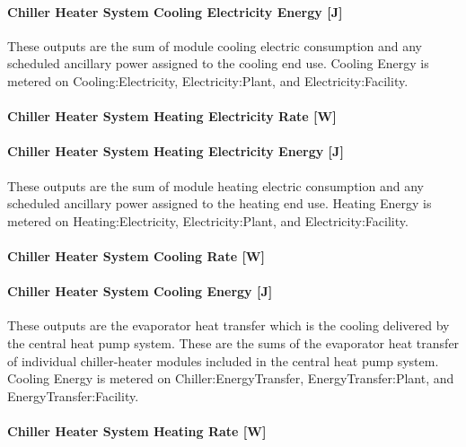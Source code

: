 \paragraph{Chiller Heater System Cooling Electricity Energy {[}J{]}}\label{chiller-heater-system-cooling-electric-energy-j}

These outputs are the sum of module cooling electric consumption and any scheduled ancillary power assigned to the cooling end use. Cooling Energy is metered on Cooling:Electricity, Electricity:Plant, and Electricity:Facility.

\paragraph{Chiller Heater System Heating Electricity Rate {[}W{]}}\label{chiller-heater-system-heating-electric-power-w}

\paragraph{Chiller Heater System Heating Electricity Energy {[}J{]}}\label{chiller-heater-system-heating-electric-energy-j}

These outputs are the sum of module heating electric consumption and any scheduled ancillary power assigned to the heating end use. Heating Energy is metered on Heating:Electricity, Electricity:Plant, and Electricity:Facility.

\paragraph{Chiller Heater System Cooling Rate {[}W{]}}\label{chiller-heater-system-cooling-rate-w}

\paragraph{Chiller Heater System Cooling Energy {[}J{]}}\label{chiller-heater-system-cooling-energy-j}

These outputs are the evaporator heat transfer which is the cooling delivered by the central heat pump system. These are the sums of the evaporator heat transfer of individual chiller-heater modules included in the central heat pump system. Cooling Energy is metered on Chiller:EnergyTransfer, EnergyTransfer:Plant, and EnergyTransfer:Facility.

\paragraph{Chiller Heater System Heating Rate {[}W{]}}\label{chiller-heater-system-heating-rate-w}

